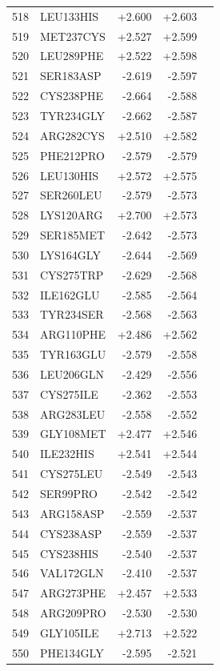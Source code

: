 \begin{longtable}{r l r r c}
518 & LEU133HIS & +2.600 & +2.603 &  \\
519 & MET237CYS & +2.527 & +2.599 &  \\
520 & LEU289PHE & +2.522 & +2.598 &  \\
521 & SER183ASP & -2.619 & -2.597 &  \\
522 & CYS238PHE & -2.664 & -2.588 &  \\
523 & TYR234GLY & -2.662 & -2.587 &  \\
524 & ARG282CYS & +2.510 & +2.582 &  \\
525 & PHE212PRO & -2.579 & -2.579 &  \\
526 & LEU130HIS & +2.572 & +2.575 &  \\
527 & SER260LEU & -2.579 & -2.573 &  \\
528 & LYS120ARG & +2.700 & +2.573 &  \\
529 & SER185MET & -2.642 & -2.573 &  \\
530 & LYS164GLY & -2.644 & -2.569 &  \\
531 & CYS275TRP & -2.629 & -2.568 &  \\
532 & ILE162GLU & -2.585 & -2.564 &  \\
533 & TYR234SER & -2.568 & -2.563 &  \\
534 & ARG110PHE & +2.486 & +2.562 &  \\
535 & TYR163GLU & -2.579 & -2.558 &  \\
536 & LEU206GLN & -2.429 & -2.556 &  \\
537 & CYS275ILE & -2.362 & -2.553 &  \\
538 & ARG283LEU & -2.558 & -2.552 &  \\
539 & GLY108MET & +2.477 & +2.546 &  \\
540 & ILE232HIS & +2.541 & +2.544 &  \\
541 & CYS275LEU & -2.549 & -2.543 &  \\
542 & SER99PRO & -2.542 & -2.542 &  \\
543 & ARG158ASP & -2.559 & -2.537 &  \\
544 & CYS238ASP & -2.559 & -2.537 &  \\
545 & CYS238HIS & -2.540 & -2.537 &  \\
546 & VAL172GLN & -2.410 & -2.537 &  \\
547 & ARG273PHE & +2.457 & +2.533 &  \\
548 & ARG209PRO & -2.530 & -2.530 &  \\
549 & GLY105ILE & +2.713 & +2.522 &  \\
550 & PHE134GLY & -2.595 & -2.521 &  \\

\end{longtable}

